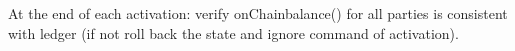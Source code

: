 \begin{functionality}{\fpaynet}
\begin{algorithmic}[1]
    \State At the end of each activation: 
    \Indent
    \State verify  onChainbalance() for all parties is consistent with ledger (if not roll back the state and ignore command of activation).
    \EndIndent
  \end{algorithmic}
\end{functionality}

